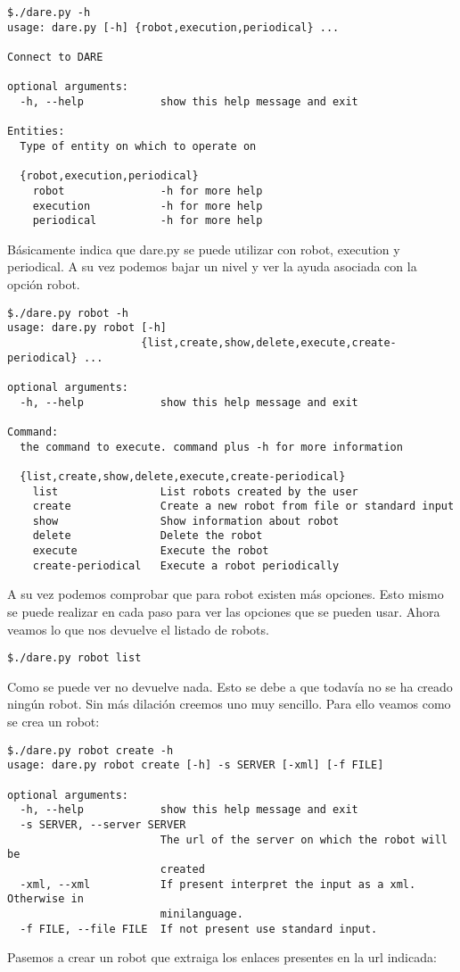 \begin{verbatim}
$./dare.py -h
usage: dare.py [-h] {robot,execution,periodical} ...

Connect to DARE

optional arguments:
  -h, --help            show this help message and exit

Entities:
  Type of entity on which to operate on

  {robot,execution,periodical}
    robot               -h for more help
    execution           -h for more help
    periodical          -h for more help
\end{verbatim}

Básicamente indica que dare.py se puede utilizar con robot, execution
y periodical. A su vez podemos bajar un nivel y ver la ayuda asociada
con la opción robot.
\begin{verbatim}
$./dare.py robot -h
usage: dare.py robot [-h]
                     {list,create,show,delete,execute,create-periodical} ...

optional arguments:
  -h, --help            show this help message and exit

Command:
  the command to execute. command plus -h for more information

  {list,create,show,delete,execute,create-periodical}
    list                List robots created by the user
    create              Create a new robot from file or standard input
    show                Show information about robot
    delete              Delete the robot
    execute             Execute the robot
    create-periodical   Execute a robot periodically

\end{verbatim}

A su vez podemos comprobar que para robot existen más opciones. Esto
mismo se puede realizar en cada paso para ver las opciones que se
pueden usar. Ahora veamos lo que nos devuelve el listado de robots.
\begin{verbatim}
$./dare.py robot list
\end{verbatim}
Como se puede ver no devuelve nada. Esto se debe a que todavía no
se ha creado ningún robot. Sin más dilación creemos uno muy
sencillo. Para ello veamos como se crea un robot:
\begin{verbatim}
$./dare.py robot create -h
usage: dare.py robot create [-h] -s SERVER [-xml] [-f FILE]

optional arguments:
  -h, --help            show this help message and exit
  -s SERVER, --server SERVER
                        The url of the server on which the robot will be
                        created
  -xml, --xml           If present interpret the input as a xml. Otherwise in
                        minilanguage.
  -f FILE, --file FILE  If not present use standard input.
\end{verbatim}
Pasemos a crear un robot que extraiga los enlaces presentes en la
url indicada:


